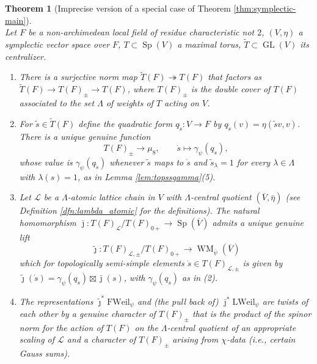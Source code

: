 \documentclass{article}
\def\mc#1{\mathcal{#1}}
\def\ol#1{\overline{#1}}
\DeclareMathOperator{\Sp}{Sp}
\DeclareMathOperator{\GL}{GL}
\newtheorem{thm}{Theorem}[subsection]
\theoremstyle{definition}
\numberwithin{equation}{subsection}
\renewcommand{\-}{\hyp{}}
\DeclareMathOperator{\WM}{WM}
\newcommand{\oV}{\ol{V}}
\begin{document}
\begin{thm}[Imprecise version of a special case of Theorem \ref{thm:symplectic-main}]\ \\
	Let $F$ be a non-archimedean local field of residue characteristic not $2$, $(V,\eta)$ a symplectic vector space over $F$, $T \subset \Sp(V)$ a maximal torus, $\tilde T \subset \GL(V)$ its centralizer.
	\begin{enumerate}
		\item There is a surjective norm map $\tilde T(F) \twoheadrightarrow T(F)$ that factors as $\tilde T(F) \to T(F)_\pm \to T(F)$, where $T(F)_\pm$ is the double cover of $T(F)$ associated to the set $\Lambda$ of weights of $T$ acting on $V$.
		\item For $\tilde s \in \tilde T(F)$ define the quadratic form $q_{\tilde s} : V \to F$ by $q_{\tilde s}(v)=\eta(\tilde sv,v)$. There is a unique genuine function
		\[ T(F)_\pm \to \mu_8,\qquad \dot s\mapsto \gamma_\psi(q_{\dot s}), \]
		whose value is $\gamma_\psi(q_{\tilde s})$ whenever $\tilde s$ maps to $\dot s$ and
		$\tilde s_\lambda=1$ for every $\lambda \in \Lambda$ with $\lambda(s)=1$, as in Lemma \ref{lem:topssgamma}(5).
		\item Let $\mc{L}$ be a $\Lambda$-atomic lattice chain in $V$ with $\Lambda$-central quotient $(\oV,\bar\eta)$ (see Definition \ref{dfn:lambda_atomic} for the definitions). The natural homomorphism 
		$\bar\jmath : T(F)_\mc{L}/T(F)_{0+} \to \Sp(\oV)$ admits a unique genuine lift 
		\[\tilde\jmath : T(F)_{\mc{L},\pm}/T(F)_{0+} \to \WM_{\bar\psi}(\oV) \] which for topologically semi-simple elements $\dot s \in T(F)_{\mc{L},\pm}$ is given by $\tilde\jmath(\dot s) = \gamma_\psi(q_{\dot s}) \boxtimes \bar\jmath(s)$,  with $\gamma_\psi(q_{\dot s})$ as in (2).
		\item The representations $\tilde\jmath^*\mathrm{FWeil}_\psi$ and (the pull back of) $\bar\jmath^*\mathrm{LWeil}_\psi$ are twists of each other by a genuine character of $T(F)_\pm$ that is the product of the spinor norm for the action of $T(F)$ on the $\Lambda$-central quotient of an appropriate scaling 
of $\mc{L}$ and a character of $T(F)_\pm$ arising from $\chi$-data (i.e., certain Gauss sums).
	\end{enumerate}
\end{thm}
\end{document}
